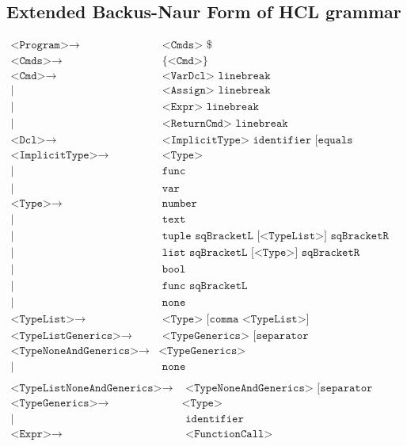 \begin{landscape}
\section{Extended Backus-Naur Form of HCL grammar}
\label{AppendixEBNF}
\begin{align*}
	\texttt{<Program>}\to & \texttt{ <Cmds> \$}\\
	\texttt{<Cmds>}\to & \texttt{ \{<Cmd>\}}\\
	\texttt{<Cmd>}\to & \texttt{ <VarDcl> linebreak}\\
	| & \texttt{ <Assign> linebreak}\\
	| & \texttt{ <Expr> linebreak}\\
	| & \texttt{ <ReturnCmd> linebreak}\\
	\texttt{<Dcl>}\to & \texttt{ <ImplicitType> identifier [equals <DclValue>]}\\
	\texttt{<ImplicitType>}\to & \texttt{ <Type>}\\
	| & \texttt{ func}\\
	| & \texttt{ var}\\
	\texttt{<Type>}\to & \texttt{ number}\\
	| & \texttt{ text}\\
	| & \texttt{ tuple sqBracketL [<TypeList>] sqBracketR}\\
	| & \texttt{ list sqBracketL [<Type>] sqBracketR}\\
	| & \texttt{ bool}\\
	| & \texttt{ func sqBracketL [<TypeListNoneAndGenerics>] sqBracketR}\\
	| & \texttt{ none}\\
	\texttt{<TypeList>}\to & \texttt{ <Type> [comma <TypeList>]}\\
	\texttt{<TypeListGenerics>}\to & \texttt{ <TypeGenerics> [separator <TypeListGenerics>] }\\
	\texttt{<TypeNoneAndGenerics>}\to & \texttt{<TypeGenerics>}\\
	| & \texttt{ none}\\
\end{align*} %
\begin{align*}
	\texttt{<TypeListNoneAndGenerics>} \to & \texttt{ <TypeNoneAndGenerics> [separator <TypeListNoneAndGenerics>]}\\
	\texttt{<TypeGenerics>}\to & \texttt{<Type>}\\
	| & \texttt{ identifier}\\
	\texttt{<Expr>}\to & \texttt{ <FunctionCall>}\\

\end{align*}
\end{landscape}
